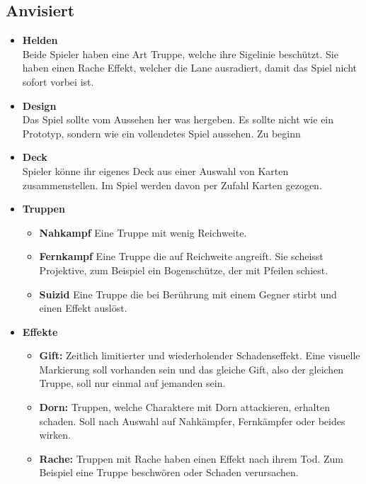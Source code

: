 \subsection*{Anvisiert}
\begin{itemize}
    \item \textbf{Helden} \\
        Beide Spieler haben eine Art Truppe, welche ihre Sigelinie beschützt. Sie haben einen Rache Effekt, welcher die
        Lane ausradiert, damit das Spiel nicht sofort vorbei ist.
    \item \textbf{Design} \\
        Das Spiel sollte vom Aussehen her was hergeben. Es sollte nicht wie ein Prototyp, sondern wie ein 
        vollendetes Spiel aussehen. Zu beginn
    \item \textbf{Deck} \\
        Spieler könne ihr eigenes Deck aus einer Auswahl von Karten zusammenstellen. Im Spiel werden davon per Zufahl Karten gezogen.
    \item \textbf{Truppen}
    \begin{itemize}
        \item \textbf{Nahkampf}
            Eine Truppe mit wenig Reichweite.
        \item \textbf{Fernkampf}
            Eine Truppe die auf Reichweite angreift. Sie scheisst Projektive, zum Beispiel ein Bogenschütze,
            der mit Pfeilen schiest.
        \item \textbf{Suizid}
            Eine Truppe die bei Berührung mit einem Gegner stirbt und einen Effekt auslöst.
    \end{itemize}
    \item \textbf{Effekte}
    \begin{itemize}
        \item \textbf{Gift:}
            Zeitlich limitierter und wiederholender Schadenseffekt. Eine visuelle Markierung soll vorhanden sein
            und das gleiche Gift, also der gleichen Truppe, soll nur einmal auf jemanden sein.
        \item \textbf{Dorn:}
            Truppen, welche Charaktere mit Dorn attackieren, erhalten schaden. Soll nach Auswahl auf Nahkämpfer,
            Fernkämpfer oder beides wirken.
        \item \textbf{Rache:}
            Truppen mit Rache haben einen Effekt nach ihrem Tod. Zum Beispiel eine Truppe beschwören oder Schaden verursachen.
    \end{itemize}
\end{itemize}

